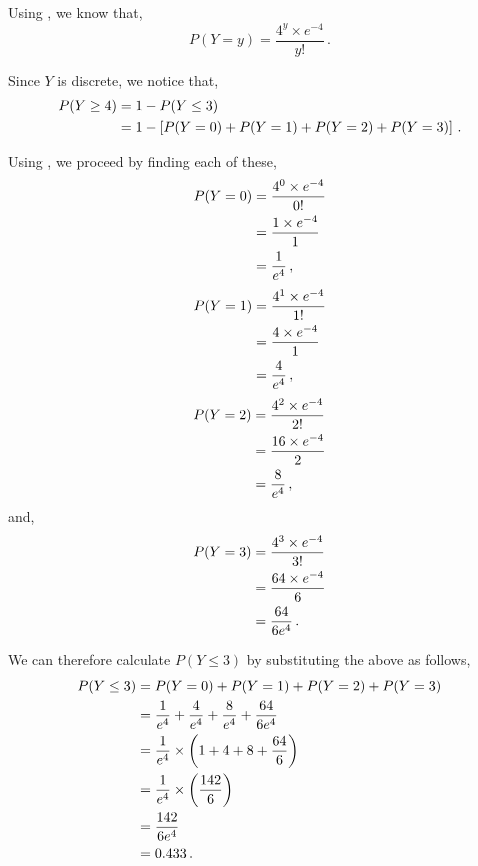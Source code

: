\begin{subquestions}
\begin{subsubquestions}
Using , we know that,
\begin{equation}
	P(Y=y)= \frac{4^y \times e^{-4}}{y!} \,. \label{2013:q4:eq:Pois1}
\end{equation}

Since $Y$ is discrete, we notice that,
\begin{align}
	P(Y \geq 4) & = 1 - P(Y \leq 3) \nonumber \\
	            & = 1 - \left[P(Y=0)+P(Y=1)+P(Y=2)+P(Y=3) \right] \,.
\end{align}

Using , we proceed by finding each of these,
\begin{align}
	P(Y=0) & = \frac{4^0 \times e^{-4}}{0!} \nonumber \\
	& = \frac{1 \times e^{-4}}{1} \nonumber\\
	& = \frac{1}{e^4} \,,
\end{align}
\begin{align}
	P(Y=1) & = \frac{4^1 \times e^{-4}}{1!} \nonumber \\
	& = \frac{4 \times e^{-4}}{1} \nonumber \\
	& = \frac{4}{e^4} \,,
\end{align}
\begin{align}      
	P(Y=2) & = \frac{4^2 \times e^{-4}}{2!} \nonumber \\
	& = \frac{16 \times e^{-4}}{2} \nonumber \\
	& = \frac{8}{e^4} \,,
\end{align}
and,
\begin{align}          
	P(Y=3) & = \frac{4^3 \times e^{-4}}{3!} \nonumber \\
	& = \frac{64 \times e^{-4}}{6} \nonumber \\
	& = \frac{64}{6e^4} \,. 
\end{align}


We can therefore calculate $P(Y \leq 3)$ by substituting the above as follows,
\begin{align}         
    P(Y \leq 3) & = P(Y=0)+P(Y=1)+P(Y=2)+P(Y=3) \nonumber \\
                & = \frac{1}{e^4} + \frac{4}{e^4} + \frac{8}{e^4} + \frac{64}{6e^4} \nonumber \\
                & = \frac{1}{e^4} \times \left(1+4+8+\frac{64}{6} \right) \nonumber \\
                & = \frac{1}{e^4} \times \left(\frac{142}{6} \right) \nonumber \\
                & = \frac{142}{6e^4} \nonumber \\
                & = 0.433 \,.
\end{align}


\end{subsubquestions}
\end{subquestions}
